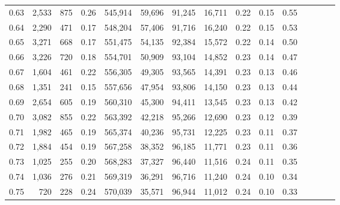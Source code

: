 \begin{tabular}{rrrcrrrrrrrrrrr}
0.63 &   2,533 &    875 &                                       0.26 &  545,914 &   59,696 &   91,245 &   16,711 &  0.22 &  0.15 &                         0.55 \\
0.64 &   2,290 &    471 &                                       0.17 &  548,204 &   57,406 &   91,716 &   16,240 &  0.22 &  0.15 &                         0.53 \\
0.65 &   3,271 &    668 &                                       0.17 &  551,475 &   54,135 &   92,384 &   15,572 &  0.22 &  0.14 &                         0.50 \\
0.66 &   3,226 &    720 &                                       0.18 &  554,701 &   50,909 &   93,104 &   14,852 &  0.23 &  0.14 &                         0.47 \\
0.67 &   1,604 &    461 &                                       0.22 &  556,305 &   49,305 &   93,565 &   14,391 &  0.23 &  0.13 &                         0.46 \\
0.68 &   1,351 &    241 &                                       0.15 &  557,656 &   47,954 &   93,806 &   14,150 &  0.23 &  0.13 &                         0.44 \\
0.69 &   2,654 &    605 &                                       0.19 &  560,310 &   45,300 &   94,411 &   13,545 &  0.23 &  0.13 &                         0.42 \\
0.70 &   3,082 &    855 &                                       0.22 &  563,392 &   42,218 &   95,266 &   12,690 &  0.23 &  0.12 &                         0.39 \\
0.71 &   1,982 &    465 &                                       0.19 &  565,374 &   40,236 &   95,731 &   12,225 &  0.23 &  0.11 &                         0.37 \\
0.72 &   1,884 &    454 &                                       0.19 &  567,258 &   38,352 &   96,185 &   11,771 &  0.23 &  0.11 &                         0.36 \\
0.73 &   1,025 &    255 &                                       0.20 &  568,283 &   37,327 &   96,440 &   11,516 &  0.24 &  0.11 &                         0.35 \\
0.74 &   1,036 &    276 &                                       0.21 &  569,319 &   36,291 &   96,716 &   11,240 &  0.24 &  0.10 &                         0.34 \\
0.75 &     720 &    228 &                                       0.24 &  570,039 &   35,571 &   96,944 &   11,012 &  0.24 &  0.10 &                         0.33 \\

\end{tabular}
